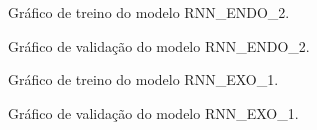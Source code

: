 \documentclass[	12pt, Times, openright, twoside, a4paper, english, brazil]{abntex2}
\begin{document}
    	    \begin{figure}[!ht]
              \caption{Gráfico de treino do modelo RNN\_ENDO\_2. \label{fig:case2_rnn_endo2_train} }
            \end{figure}
            \begin{figure}[!ht]
              \caption{Gráfico de validação do modelo RNN\_ENDO\_2. \label{fig:case2_rnn_endo2_val} }
            \end{figure}
            
    	    \begin{figure}[!ht]
              \caption{Gráfico de treino do modelo RNN\_EXO\_1. \label{fig:case2_rnn_exo1_train} }
            \end{figure}
            \begin{figure}[!ht]
              \caption{Gráfico de validação do modelo  RNN\_EXO\_1. \label{fig:case2_rnn_exo1_val} }
            \end{figure}
            
\end{document}
